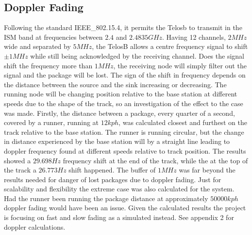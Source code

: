 \subsection{Doppler Fading}
Following the standard IEEE\_802.15.4, it permits the Telosb to transmit in the ISM  band at frequencies between $2.4$ and $2.4835 GHz$. Having 12 channels, $2 MHz$ wide and separated by $5 MHz$, the TelosB allows a centre frequency signal to shift $\pm 1 MHz$ while still being acknowledged by the receiving channel. Does the signal shift the frequency more than $1 MHz$, the receiving node will simply filter out the signal and the package will be lost. The sign of the shift in frequency depends on the distance between the source and the sink increasing or decreasing. The running node will be changing position relative to the base station at different speeds due to the shape of the track, so an investigation of the effect to the case was made. Firstly, the distance between a package, every quarter of a second, covered by a runner, running at $12kph$, was calculated closest and furthest on the track relative to the base station. The runner is running circular, but the change in distance experienced by the base station will by a straight line leading to doppler frequency found at different speeds relative to track position. The results showed a $29.698Hz$ frequency shift at the end of the track, while the at the top of the track a $26.773Hz$ shift happened. The buffer of $1MHz$ was far beyond the results needed for danger of lost packages due to doppler fading. Just for scalability and flexibility the extreme case was also calculated for the system. Had the runner been running the package distance at approximately $50000kph$ doppler fading would have been an issue. Given the calculated results the project is focusing on fast and slow fading as a simulated instead. See appendix 2 for doppler calculations.

